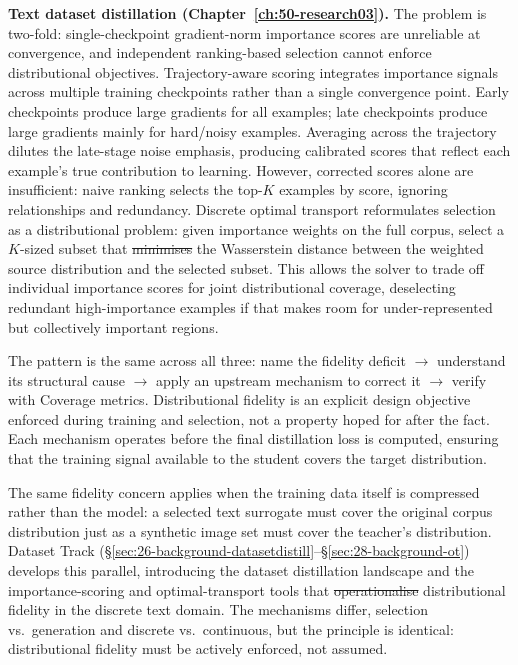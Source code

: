 \documentclass[12pt, a4paper, twoside]{book}
\makeatletter
\numberwithin{equation}{chapter}
\theoremstyle{plain}
\theoremstyle{definition}
\theoremstyle{remark}
\newenvironment{foldable}{}{}
\providecommand{\DIFaddtex}[1]{{\protect\color{blue}\uwave{#1}}} %
\providecommand{\DIFdeltex}[1]{{\protect\color{red}\sout{#1}}} %
\providecommand{\DIFaddbegin}{} %
\providecommand{\DIFaddend}{} %
\providecommand{\DIFdelbegin}{} %
\providecommand{\DIFdelend}{} %
\providecommand{\DIFadd}[1]{\texorpdfstring{\DIFaddtex{#1}}{#1}} %
\providecommand{\DIFdel}[1]{\texorpdfstring{\DIFdeltex{#1}}{}} %
\newcommand{\DIFscaledelfig}{0.5}
\newlength{\DIFdelgraphicswidth} %
\newlength{\DIFdelgraphicsheight} %
\newcommand{\DIFaddincludegraphics}[2][]{{\color{blue}\fbox{\DIFOincludegraphics[#1]{#2}}}} %
\newcommand{\DIFdelincludegraphics}[2][]{%
\sbox{\DIFdelgraphicsbox}{\DIFOincludegraphics[#1]{#2}}%
\settoboxwidth{\DIFdelgraphicswidth}{\DIFdelgraphicsbox} %
\settoboxtotalheight{\DIFdelgraphicsheight}{\DIFdelgraphicsbox} %
\scalebox{\DIFscaledelfig}{%
\parbox[b]{\DIFdelgraphicswidth}{\usebox{\DIFdelgraphicsbox}\\[-\baselineskip] \rule{\DIFdelgraphicswidth}{0em}}\llap{\resizebox{\DIFdelgraphicswidth}{\DIFdelgraphicsheight}{%
\setlength{\unitlength}{\DIFdelgraphicswidth}%
\begin{picture}(1,1)%
\thicklines\linethickness{2pt} %
{\color[rgb]{1,0,0}\put(0,0){\framebox(1,1){}}}%
{\color[rgb]{1,0,0}\put(0,0){\line( 1,1){1}}}%
{\color[rgb]{1,0,0}\put(0,1){\line(1,-1){1}}}%
\end{picture}%
}\hspace*{3pt}}} %
} %
\DeclareRobustCommand{\DIFaddbegin}{\DIFOaddbegin \let\includegraphics\DIFaddincludegraphics} %
\DeclareRobustCommand{\DIFaddend}{\DIFOaddend \let\includegraphics\DIFOincludegraphics} %
\DeclareRobustCommand{\DIFdelbegin}{\DIFOdelbegin \let\includegraphics\DIFdelincludegraphics} %
\DeclareRobustCommand{\DIFdelend}{\DIFOaddend \let\includegraphics\DIFOincludegraphics} %
\let\sout@orig\sout %
\renewcommand{\sout}[1]{\ifmmode\text{\sout@orig{\ensuremath{#1}}}\else\sout@orig{#1}\fi} %
\makeatother
\begin{document}
\begin{foldable}
  \textbf{Text dataset distillation (Chapter~\ref{ch:50-research03}).}
  The problem is two-fold: single-checkpoint gradient-norm importance scores are unreliable at convergence, and independent ranking-based selection cannot enforce distributional objectives.
  Trajectory-aware scoring integrates importance signals across multiple training checkpoints rather than a single convergence point.
  Early checkpoints produce large gradients for all examples; late checkpoints produce large gradients mainly for hard/noisy examples.
  Averaging across the trajectory dilutes the late-stage noise emphasis, producing calibrated scores that reflect each example's true contribution to learning.
  However, corrected scores alone are insufficient: naive ranking selects the top-$K$ examples by score, ignoring relationships and redundancy.
  Discrete optimal transport reformulates selection as a distributional problem: given importance weights on the full corpus, select a $K$-sized subset that \DIFdelbegin \DIFdel{minimises }\DIFdelend \DIFaddbegin \DIFadd{minimizes }\DIFaddend the Wasserstein distance between the weighted source distribution and the selected subset.
  This allows the solver to trade off individual importance scores for joint distributional coverage, deselecting redundant high-importance examples if that makes room for under-represented but collectively important regions.
\end{foldable}

\begin{foldable}
  The pattern is the same across all three: name the fidelity deficit $\to$ understand its structural cause $\to$ apply an upstream mechanism to correct it $\to$ verify with Coverage metrics.
  Distributional fidelity is an explicit design objective enforced during training and selection, not a property hoped for after the fact.
  Each mechanism operates before the final distillation loss is computed, ensuring that the training signal available to the student covers the target distribution.
\end{foldable}

\begin{foldable}
  The same fidelity concern applies when the training data itself is compressed rather than the model: a selected text surrogate must cover the original corpus distribution just as a synthetic image set must cover the teacher's distribution.
  Dataset Track (\S\ref{sec:26-background-datasetdistill}--\S\ref{sec:28-background-ot}) develops this parallel, introducing the dataset distillation landscape and the importance-scoring and optimal-transport tools that \DIFdelbegin \DIFdel{operationalise }\DIFdelend \DIFaddbegin \DIFadd{operationalize }\DIFaddend distributional fidelity in the discrete text domain.
  The mechanisms differ, selection vs.\ generation and discrete vs.\ continuous, but the principle is identical: distributional fidelity must be actively enforced, not assumed.
\end{foldable}
\end{document}
